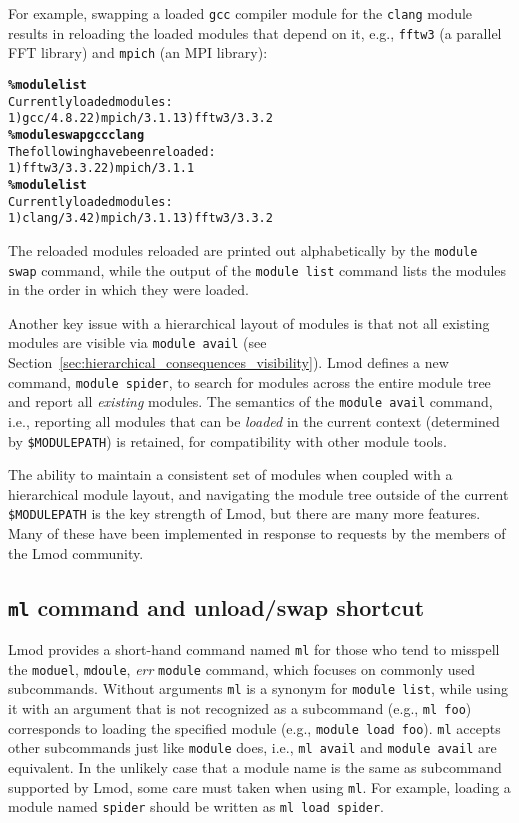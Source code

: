 For example, swapping a loaded \texttt{\small gcc} compiler module for the
\texttt{\small {clang}} module results in reloading the loaded modules that
depend on it, e.g., \texttt{\small fftw3} (a parallel FFT library) and
\texttt{\small mpich} (an MPI library):
{\small
  \begin{alltt}
    \textbf{\% module list}
    Currently loaded modules:
    1) gcc/4.8.2  2) mpich/3.1.1  3) fftw3/3.3.2
    \textbf{\% module swap gcc clang}
    The following have been reloaded:
    1) fftw3/3.3.2  2) mpich/3.1.1
    \textbf{\% module list}
    Currently loaded modules:
    1) clang/3.4  2) mpich/3.1.1  3) fftw3/3.3.2
\end{alltt}
}
\noindent
The reloaded modules reloaded are printed out
alphabetically by the \texttt{\small module swap} command, while the output of
the \texttt{\small module list} command lists the modules in the order in which
they were loaded.


Another key issue with a hierarchical layout of modules is that not all
existing modules are visible via \texttt{\small module avail} (see
Section~\ref{sec:hierarchical_consequences_visibility}). Lmod defines a
new command, \texttt{\small module spider}, to search for modules across the
entire module tree and report all \emph{existing} modules. The semantics of
the \texttt{\small module avail} command, i.e., reporting all modules that can
be \emph{loaded} in the current context (determined by
\texttt{\small \$MODULEPATH}) is retained, for compatibility with other module
tools.

The ability to maintain a consistent set of modules when coupled with a
hierarchical module layout, and navigating the module tree outside of the
current \texttt{\small \$MODULEPATH} is the key strength of Lmod, but there are
many more features.  Many of these have been implemented in response to
requests by the members of the Lmod community.

\subsection{\texttt{\small ml} command and unload/swap shortcut}

Lmod provides a short-hand command named \texttt{\small ml} for those who tend to
misspell the \texttt{\small moduel}, \texttt{\small mdoule}, \emph{err}
\texttt{\small module} command, which focuses on
commonly used subcommands. Without arguments \texttt{\small ml} is a synonym for
\texttt{\small module list}, while using it with an argument that is not
recognized as a subcommand (e.g., \texttt{\small ml foo}) corresponds to loading
the specified module (e.g., \texttt{\small module load foo}).
\texttt{\small ml} accepts other subcommands just like \texttt{\small module} does,
i.e., \texttt{\small ml avail} and \texttt{\small module avail} are equivalent.
In the unlikely case that a module name is the same as subcommand supported by Lmod, 
some care must taken when using \texttt{\small ml}. For example, loading a module
named \texttt{\small spider} should be written as \texttt{\small ml load spider}.

